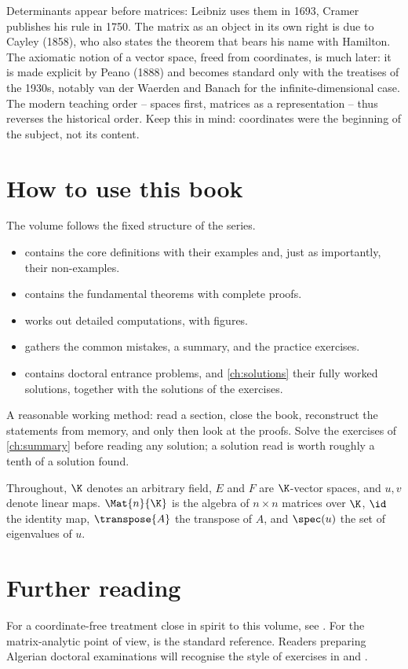 Determinants appear before matrices: Leibniz uses them in 1693, Cramer publishes
his rule in 1750. The matrix as an object in its own right is due to Cayley
(1858), who also states the theorem that bears his name with Hamilton. The
axiomatic notion of a vector space, freed from coordinates, is much later: it is
made explicit by Peano (1888) and becomes standard only with the treatises of
the 1930s, notably van der Waerden and Banach for the infinite-dimensional case.
The modern teaching order -- spaces first, matrices as a representation -- thus
reverses the historical order. Keep this in mind: coordinates were the beginning
of the subject, not its content.

\section{How to use this book}

The volume follows the fixed structure of the series.

\begin{itemize}
  \item {} contains the core definitions with their examples
        and, just as importantly, their non-examples.
  \item {} contains the fundamental theorems with complete proofs.
  \item {} works out detailed computations, with figures.
  \item {} gathers the common mistakes, a summary, and the
        practice exercises.
  \item {} contains doctoral entrance problems, and
        \cref{ch:solutions} their fully worked solutions, together with the
        solutions of the exercises.
\end{itemize}

A reasonable working method: read a section, close the book, reconstruct the
statements from memory, and only then look at the proofs. Solve the exercises of
\cref{ch:summary} before reading any solution; a solution read is worth roughly
a tenth of a solution found.

\begin{note}[Notation]
Throughout, $\K$ denotes an arbitrary field, $E$ and $F$ are $\K$-vector spaces,
and $u,v$ denote linear maps. $\Mat{n}{\K}$ is the algebra of $n\times n$
matrices over $\K$, $\id$ the identity map, $\transpose{A}$ the transpose of $A$,
and $\spec(u)$ the set of eigenvalues of $u$.
\end{note}

\section{Further reading}

For a coordinate-free treatment close in spirit to this volume, see
\textcite{axler2015}. For the matrix-analytic point of view, \textcite{horn2013}
is the standard reference. Readers preparing Algerian doctoral examinations will
recognise the style of exercises in \textcite{gourdon2009} and
\textcite{grifone2011}.
